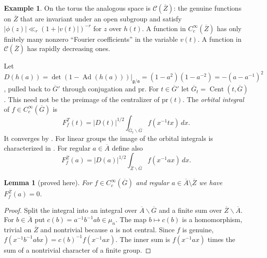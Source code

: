 \documentclass[12pt,letterpaper]{article}
\numberwithin{equation}{section}
\newtheorem{lemma}[theorem]{Lemma}
\theoremstyle{definition}
\newtheorem{xexample}[theorem]{Example}
\newcommand{\proved}{proved here}
\newcommand{\bG}{\overline{G}}
\newcommand{\bA}{\overline{A}}
\newcommand{\bZ}{\overline{Z}}
\newcommand{\pr}{\mathrm{pr}}
\newcommand{\calC}{\mathcal C}
\DeclareMathOperator{\Ad}{Ad}
\DeclareMathOperator{\Cent}{Cent}
\begin{document}
\begin{xexample}
On the torus the analogous space is $\calC(\bZ)$: the genuine functions on $\bZ$ that are
invariant under an open subgroup and satisfy $|\phi(z)|\ll_r(1+|v(t)|)^{-r}$ for $z$ over
$h(t)$.  A function in $C_c^\infty(\bZ)$ has only finitely many nonzero ``Fourier
coefficients'' in the variable $v(t)$.  A function in $\calC(\bZ)$ has rapidly decreasing
ones.
\end{xexample}

Let $D(h(a))=\det(1-\Ad(h(a)))|_{\mathfrak g/\mathfrak a}=(1-a^2)(1-a^{-2})=-(a-a^{-1})^2$,
pulled back to $\bG'$ through conjugation and $\pr$.  For $t\in\bG'$ let
$\bG_t=\Cent(t,\bG)$.  This need not be the preimage of the centralizer of $\pr(t)$.  The
\emph{orbital integral} of $f\in C_c^\infty(\bG)$ is
\begin{equation}\label{eq:orbital}
F_f^{T}(t)=|D(t)|^{1/2}\int_{\bG_t\backslash\bG}f(x^{-1}tx)\,dx .
\end{equation}
It converges by \cite{HC70}.  For linear groups the image of the orbital integrals is
characterized in \cite{Vi81}.  For regular $a\in\bA$ define also
\begin{equation}\label{eq:orbital-Z}
F_f^{\bZ}(a)=|D(a)|^{1/2}\int_{\bZ\backslash\bG}f(x^{-1}ax)\,dx .
\end{equation}

\begin{lemma}[\proved]\label{lem:vanish}
For $f\in C_c^\infty(\bG)$ and regular $a\in\bA\setminus\bZ$ we have $F_f^{\bZ}(a)=0$.
\end{lemma}
\begin{proof}
Split the integral into an integral over $\bA\backslash\bG$ and a finite sum over
$\bZ\backslash\bA$.  For $b\in\bA$ put $c(b)=a^{-1}b^{-1}ab\in\mu_n$.  The map $b\mapsto c(b)$ is
a homomorphism, trivial on $\bZ$ and nontrivial because $a$ is not central.  Since $f$ is
genuine, $f(x^{-1}b^{-1}abx)=c(b)^{-1}f(x^{-1}ax)$.  The inner sum is $f(x^{-1}ax)$ times the
sum of a nontrivial character of a finite group.
\end{proof}
\end{document}
